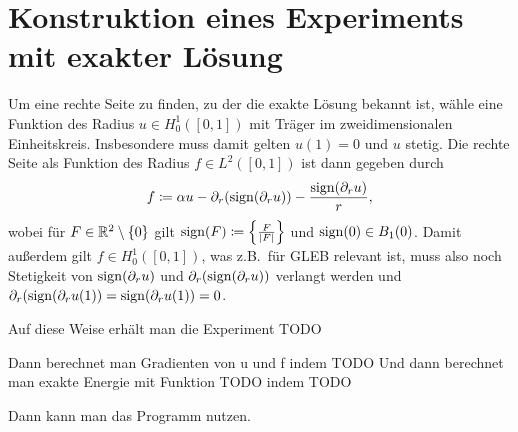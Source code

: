 \section{Konstruktion eines Experiments mit exakter Lösung}
Um eine rechte Seite zu finden, zu der die exakte Lösung bekannt
ist, wähle eine Funktion des Radius $u\in H^1_0([0,1])$ mit Träger im 
zweidimensionalen Einheitskreis. Insbesondere muss damit gelten $u(1)=0$ und
$u$ stetig.
Die rechte Seite als Funktion des Radius $f\in L^2([0,1])$ ist dann gegeben
durch 
\begin{align*}
  f \coloneqq 
  \alpha u - \partial_r(\operatorname{sign}(\partial_r u)) - \frac{\operatorname{sign}(\partial_r u)}{r},
\end{align*}
wobei für $F\in\mathbb{R}^2\setminus\{0\}$ gilt 
$\operatorname{sign}(F)\coloneqq \left\{\frac{F}{|F|}\right\}$ 
und $\operatorname{sign}(0)\in B_1(0)$.
Damit außerdem gilt $f\in H^1_0([0,1])$, was z.B.\ für GLEB relevant ist, 
muss also noch Stetigkeit von $\operatorname{sign}(\partial_r u)$ und 
$\partial_r(\operatorname{sign}(\partial_r u))$ verlangt werden und 
$\partial_r(\operatorname{sign}(\partial_r u(1))=\operatorname{sign}(\partial_r u(1))=0$.

Auf diese Weise erhält man die Experiment TODO

Dann berechnet man Gradienten von u und f indem TODO
Und dann berechnet man exakte Energie mit Funktion TODO indem TODO

Dann kann man das Programm nutzen.
